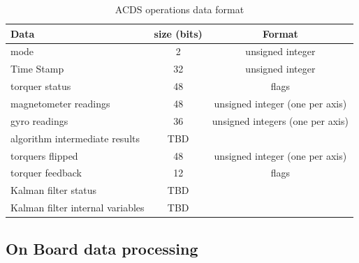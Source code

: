 \begin{table}[H]
    \begin{tabular}{|l|c|c|}
        \hline
        Data&size (bits)&Format\\
        \hline
        mode&2&unsigned integer\\
        \hline
        Time Stamp&32&unsigned integer\\
        \hline
        torquer status&48&flags\\
        \hline
        magnetometer readings&48&unsigned integer (one per axis)\\
        \hline
        gyro readings&36&unsigned integers (one per axis)\\
        \hline
        algorithm intermediate results&TBD&\\
        \hline
        torquers flipped&48&unsigned integer (one per axis)\\
        \hline
        torquer feedback&12&flags\\
        \hline
        Kalman filter status&TBD&\\
        \hline
        Kalman filter internal variables&TBD&\\
        \hline
    \end{tabular}
    \caption{\ac{ACDS} operations data format}
    \label{tab:logdat}
\end{table}

\subsection{On Board data processing}

